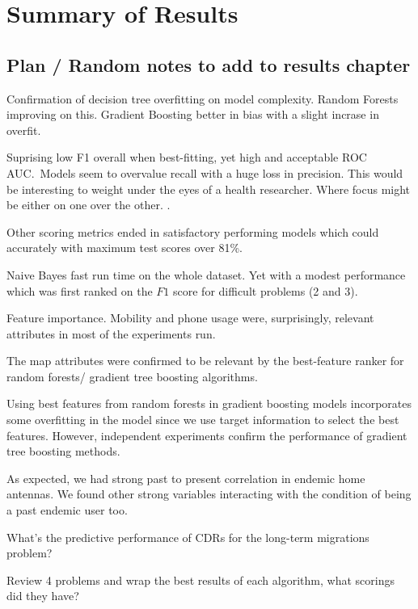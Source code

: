 

\chapter{Summary of Results}\label{ch:results_conclusion}

\section{Plan / Random notes to add to results chapter}

\begin{description}
    \item Confirmation of decision tree overfitting on model complexity. Random Forests improving on this. Gradient Boosting better in bias with a slight incrase in overfit.
    \item Suprising low F1 overall when best-fitting, yet high and acceptable ROC AUC.\ Models seem to overvalue recall with a huge loss in precision. This would be interesting to weight under the eyes of a health researcher. Where focus might be either on one over the other. .
    \item Other scoring metrics ended in satisfactory performing models which could accurately with maximum test scores over 81\%.
    \item Naive Bayes fast run time on the whole dataset. Yet with a modest performance which was first ranked on the $F1$ score for difficult problems (2 and 3).
    \item [DONE] Feature importance. Mobility and phone usage were, surprisingly, relevant attributes in most of the experiments run.
    \item [DONE] The map attributes were confirmed to be relevant by the best-feature ranker for random forests/ gradient tree boosting algorithms.
    \item Using best features from random forests in gradient boosting models incorporates some overfitting in the model since we use target information to select the best features. However, independent experiments confirm the performance of gradient tree boosting methods.
    \item As expected, we had strong past to present correlation in endemic home antennas. We found other strong variables interacting with the condition of being a past endemic user too.
    \item What's the predictive performance of CDRs for the long-term migrations problem?
    \item Review 4 problems and wrap the best results of each algorithm, what scorings did they have?


\end{description}


